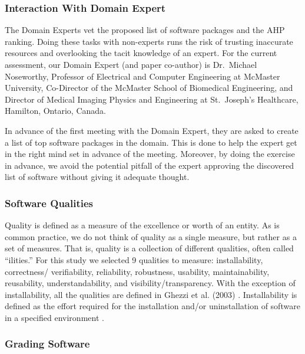\documentclass[11pt]{article}
\begin{document}
\subsubsection{Interaction With Domain Expert} \label{sec_vet_software_list}

The Domain Experts vet the proposed list of software packages and the AHP
ranking.  Doing these tasks with non-experts runs the risk of trusting
inaccurate resources and overlooking the tacit knowledge of an expert. For the
current assessment, our Domain Expert (and paper co-author) is Dr.\ Michael
Noseworthy, Professor of Electrical and Computer Engineering at McMaster
University, Co-Director of the McMaster School of Biomedical Engineering, and
Director of Medical Imaging Physics and Engineering at St.\ Joseph's Healthcare,
Hamilton, Ontario, Canada.  

In advance of the first meeting with the Domain Expert, they are asked to
create a list of top software packages in the domain.  This is done to help
the expert get in the right mind set in advance of the meeting.  Moreover,
by doing the exercise in advance, we avoid the potential pitfall of the expert
approving the discovered list of software without giving it adequate thought.

\subsubsection{Software Qualities} \label{sec_software_quality}

Quality is defined as a measure of the excellence or worth of an entity.  As is
common practice, we do not think of quality as a single measure, but rather as a
set of measures.  That is, quality is a collection of different qualities, often
called ``ilities.''  For this study we selected 9 qualities to measure:
installability, correctness/ verifiability, reliability, robustness, usability,
maintainability, reusability, understandability, and visibility/transparency.
With the exception of installability, all the qualities are defined in Ghezzi et
al. (2003) \cite{GhezziEtAl2003}. Installability is defined as the effort
required for the installation and/or uninstallation of software in a specified
environment \cite{ISO/IEC25010, lenhard2013measuring}.

\subsubsection{Grading Software} \label{sec_grading_software}
\end{document}
